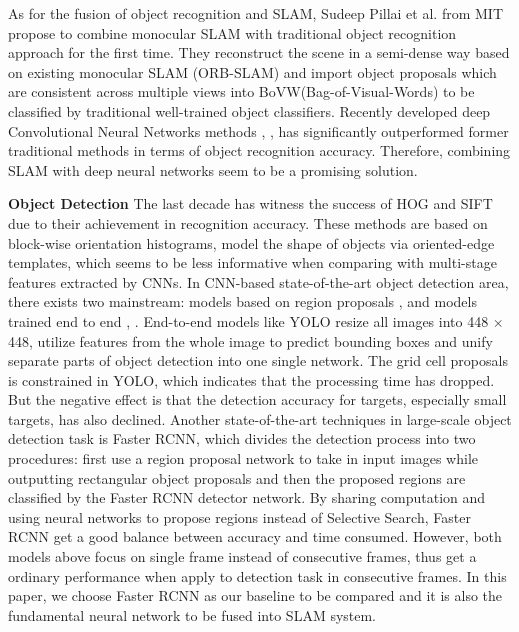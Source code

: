 \documentclass[conference]{IEEEtran}
\begin{document}
As for the fusion of  object recognition and SLAM, Sudeep Pillai et al. \cite{Pillai} from MIT propose to combine monocular SLAM with traditional object recognition approach for the first time. They reconstruct the scene in a semi-dense way based on existing monocular SLAM (ORB-SLAM) and import object proposals which are consistent across multiple views into BoVW(Bag-of-Visual-Words) to be classified by traditional well-trained object classifiers. Recently developed deep Convolutional Neural Networks methods \cite{Redmon2016}, \cite{Girshick2015}, \cite{ren2015faster} has significantly outperformed former traditional methods in terms of object recognition accuracy. Therefore, combining SLAM with deep neural networks seem to be a promising solution.

\textbf{Object Detection} 
The last decade has witness the success of HOG \cite{Dalal2005} and SIFT \cite{Lowe2004} due to their achievement in recognition accuracy. These methods are based on block-wise orientation histograms, model the shape of objects via oriented-edge templates, which seems to be less informative when comparing with multi-stage  features extracted by CNNs. In CNN-based state-of-the-art object detection area, there exists two mainstream: models based on region proposals \cite{Girshick2015}, \cite{ren2015faster} and models trained end to end \cite{Redmon2016}, \cite{Liu2016}. End-to-end models like YOLO resize all images into 448 $\times$ 448, utilize features from the whole image to predict bounding boxes and unify separate parts of object detection into one single network. The grid cell proposals is constrained in YOLO, which indicates that the processing time has dropped. But the negative effect is that the detection accuracy for targets, especially small targets, has also declined. Another state-of-the-art techniques in large-scale object detection task is Faster RCNN, which divides the detection process into two procedures: first use a region proposal network to take in input images while outputting rectangular object proposals and then the proposed regions are classified by the Faster RCNN detector network. By sharing computation and using neural networks to propose regions instead of Selective Search, Faster RCNN get a good balance between accuracy and time consumed. However, both models above focus on single frame instead of consecutive frames, thus get a ordinary performance when apply to detection task in consecutive frames.  In this paper, we choose Faster RCNN as our baseline to be compared and it is also the fundamental neural network to be fused into SLAM system.
\end{document}

